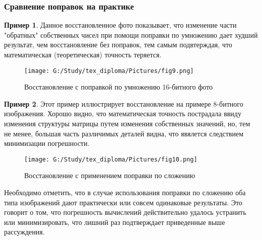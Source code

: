 \documentclass[a4paper]{article}
\theoremstyle{definition}
\newtheorem*{example}{Пример}
\begin{document}
\newpage

\subsubsection{Сравнение поправок на практике}


\begin{example}

Данное восстановленное фото показывает, что изменение части "обратных" собственных чисел при помощи поправки по умножению дает худший результат, чем восстановление без поправок, тем самым подвтерждая, что математическая (теоретическая) точность теряется.


\begin{minipage}{150mm}
    \begin{figure}[H]
            \texttt{[image: G:/Study/tex\_diploma/Pictures/fig9.png]}
            \label{Pic9}
            \caption[Восстановление с поправкой по умножению 16-битного фото]{Восстановление с поправкой по умножению 16-битного фото}
        \end{figure}
\end{minipage}
\hfill
\vspace*{2mm}

\end{example}


\newpage


\begin{example}

Этот пример иллюстрирует восстановление на примере 8-битного изображения. Хорошо видно, что математическая точность пострадала ввиду изменения структуры матрицы путем изменения собственных значений, но, тем не менее, большая часть различимых деталей видна, что явялется следствием минимизации погрешности.


\begin{minipage}{150mm}
  \begin{figure}[H]
            \texttt{[image: G:/Study/tex\_diploma/Pictures/fig10.png]}
            \label{Pic10}
            \caption[Восстановление с применением поправки по сложению]{Восстановление с применением поправки по сложению}
        \end{figure}
\end{minipage}
\hfill
\vspace*{2mm}

\end{example}


Необходимо отметить, что в случае использования поправки по сложению оба типа изображений дают практически или совсем одинаковые результаты. Это говорит о том, что погрешность вычислений действительно удалось устранить или минимизировать, что лишний раз подтверждает приведенные выше рассуждения.
\end{document}
